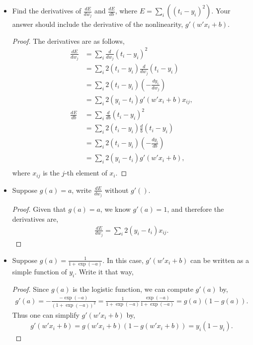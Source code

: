 \documentclass[11pt]{article}
\newcommand{\1}{\mathbf{1}}
\begin{document}
\begin{itemize}
  \item Find the derivatives of $\frac{dE}{dw_j}$ and $\frac{dE}{db}$, where $E=\sum_i ((t_i-y_i)^2)$. Your answer should include the derivative of the nonlinearity, $g'(w'x_i+b)$.
  \begin{proof}
    The derivatives are as follows,
    \begin{align*}
      \frac{dE}{dw_j} &= \sum_i \frac{d}{dw_j}(t_i-y_i)^2 \\
      &= \sum_i 2(t_i-y_i)\frac{d}{dw_j}(t_i-y_i) \\
      &= \sum_i 2(t_i-y_i)(-\frac{dy_i}{dw_j}) \\
      &= \sum_i 2(y_i-t_i)g'(w'x_i + b)x_{ij}, \\
      \frac{dE}{db} &= \sum_i \frac{d}{db}(t_i-y_i)^2 \\
      &= \sum_i 2(t_i-y_i)\frac{d}{b}(t_i-y_i) \\
      &= \sum_i 2(t_i-y_i)(-\frac{dy_i}{db}) \\
      &= \sum_i 2(y_i-t_i)g'(w'x_i + b), \\
    \end{align*}
    where $x_{ij}$ is the $j$-th element of $x_i$.
  \end{proof}
  \item Suppose $g(a) = a$, write $\frac{dE}{dw_j}$ without $g'()$.
  \begin{proof}
    Given that $g(a) = a$, we know $g'(a) = 1$, and therefore the derivatives are,
    \begin{align*}
      \frac{dE}{dw_j} = \sum_i 2(y_i-t_i)x_{ij}.
    \end{align*}
  \end{proof}
  \item Suppose $g(a) = \frac{1}{1+\exp(-a)}$. In this case, $g'(w'x_i+b)$ can be written as a simple function of $y_i$. Write it that way,
  \begin{proof}
    Since $g(a)$ is the logistic function, we can compute $g'(a)$ by,
    \begin{align*}
      g'(a) = -\frac{-\exp(-a)}{(1+\exp(-a))^2} = \frac{1}{1+\exp(-a)}\frac{\exp(-a)}{1+\exp(-a)} = g(a)(1-g(a)).
    \end{align*}
    Thus one can simplify $g'(w'x_i + b)$ by,
    \begin{align*}
      g'(w'x_i + b) = g(w'x_i + b)(1-g(w'x_i + b)) = y_i(1-y_i).
    \end{align*}
  \end{proof}

\end{itemize}
\end{document}
